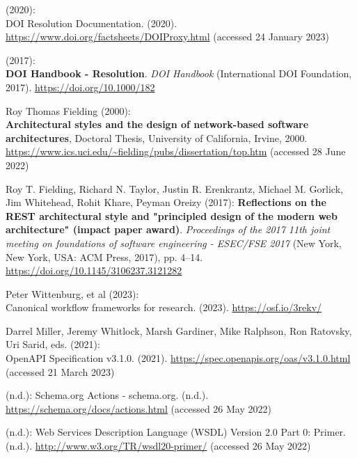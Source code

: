 \begin{thebibliography}{9}
(2020): \\
{DOI Resolution Documentation}. (2020).
\url{https://www.doi.org/factsheets/DOIProxy.html} (accessed 24 January
2023)

(2017): \\
\textbf{{DOI Handbook} - {Resolution}}. \emph{{DOI Handbook}}
({International DOI Foundation}, 2017).
\url{https://doi.org/10.1000/182}

Roy Thomas Fielding (2000): \\
\textbf{Architectural styles and the design
of network-based software architectures}, Doctoral Thesis, {University
of California, Irvine}, 2000.
\url{https://www.ics.uci.edu/~fielding/pubs/dissertation/top.htm}
(accessed 28 June 2022)

Roy T. Fielding, Richard N. Taylor, Justin R. Erenkrantz, Michael M.
Gorlick, Jim Whitehead, Rohit Khare, Peyman Oreizy (2017):
\textbf{Reflections on the {REST} architectural style and "principled
design of the modern web architecture" (impact paper award)}.
\emph{Proceedings of the 2017 11th joint meeting on foundations of
software engineering - {ESEC}/{FSE} 2017} ({New York, New York, USA}:
{ACM Press}, 2017), pp. 4--14.
\url{https://doi.org/10.1145/3106237.3121282}

Peter Wittenburg, et al (2023): \\
Canonical workflow frameworks for
research. (2023). \url{https://osf.io/3rekv/}

Darrel Miller, Jeremy Whitlock, Marsh Gardiner, Mike Ralphson, Ron
Ratovsky, Uri Sarid, eds. (2021): \\
{OpenAPI Specification} v3.1.0.
(2021). \url{https://spec.openapis.org/oas/v3.1.0.html} (accessed 21
March 2023)

(n.d.): Schema.org {Actions} - schema.org. (n.d.).
\url{https://schema.org/docs/actions.html} (accessed 26 May 2022)

(n.d.): Web {Services Description Language} ({WSDL}) {Version} 2.0
{Part} 0: {Primer}. (n.d.). \url{http://www.w3.org/TR/wsdl20-primer/}
(accessed 26 May 2022)


\end{thebibliography}
